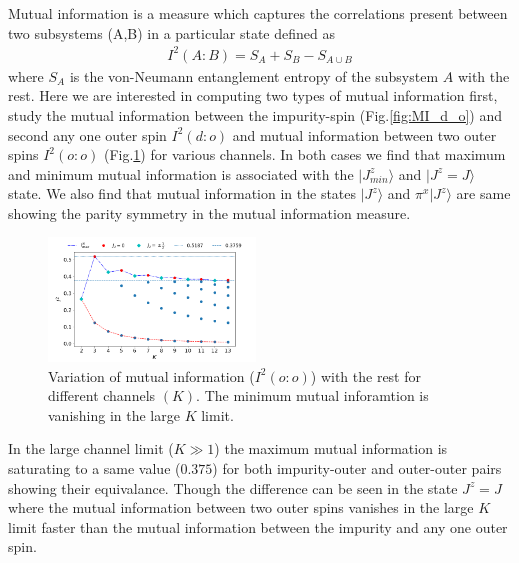 \documentclass[reprint,prb,superscriptaddress]{revtex4-1}
\begin{document}
\noindent  Mutual information is a measure which captures the correlations present between two subsystems (A,B) in a particular state defined as
\begin{eqnarray}
I^2(A:B)=S_A+S_B-S_{A\cup B}
\end{eqnarray}
where $S_{A}$ is the von-Neumann entanglement entropy of the subsystem $A$ with the rest. Here we are interested in computing two types of mutual information first, study the mutual information between the impurity-spin (Fig.\ref{fig:MI_d_o}) and second any one outer spin $I^2(d:o)$ and mutual information between two outer spins $I^2(o:o)$ (Fig.\ref{fig:MI_o_o}) for various channels. In both cases we find that maximum and minimum mutual information is associated with the $|J^z_{min}\rangle$ and $|J^z=J\rangle$ state. We also find that mutual information in the states $|J^z\rangle$ and $\pi^x|J^z\rangle$ are same showing the parity symmetry in the mutual information measure.
\begin{figure}[!htpb]
\includegraphics[width=0.49\textwidth]{plt/NEW31Dec_I_2_vs_Nch_[1,2]}
\caption{Variation of mutual information ($I^2(o:o)$) with the rest for different channels $(K)$. The minimum mutual inforamtion is vanishing in the large $K$ limit.}
\label{fig:MI_o_o}
\end{figure}
%
%
\noindent In the large channel limit ($K\gg 1$) the maximum mutual information is saturating to a same value ($0.375$) for both impurity-outer and outer-outer pairs showing their equivalance. Though the difference can be seen in the state $J^z=J$ where the mutual information between two outer spins vanishes in the large $K$ limit faster than the mutual information between the impurity and any one outer spin. 
\end{document}
